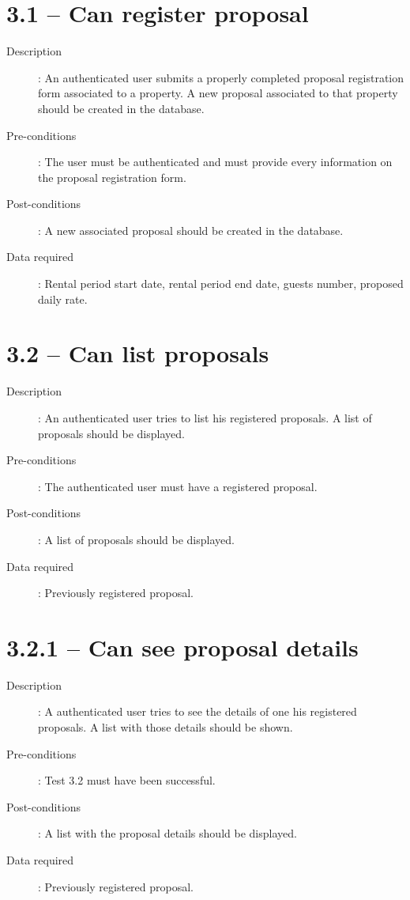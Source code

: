 \section*{3.1 – Can register proposal}

\begin{description}
    \item[Description]: An authenticated user submits a properly completed proposal registration form associated to a property. A new proposal associated to that property should be created in the database.
    \item[Pre-conditions]: The user must be authenticated and must provide every information on the proposal registration form.
    \item[Post-conditions]: A new associated proposal should be created in the database.
    \item[Data required]: Rental period start date, rental period end date, guests number, proposed daily rate.
\end{description}

\section*{3.2 – Can list proposals}

\begin{description}
    \item[Description]: An authenticated user tries to list his registered proposals. A list of proposals should be displayed.
    \item[Pre-conditions]: The authenticated user must have a registered proposal.
    \item[Post-conditions]: A list of proposals should be displayed.
    \item[Data required]: Previously registered proposal.
\end{description}

\section*{3.2.1 – Can see proposal details}
\begin{description}
    \item[Description]: A authenticated user tries to see the details of one his registered proposals. A list with those details should be shown.
    \item[Pre-conditions]: Test 3.2 must have been successful.
    \item[Post-conditions]: A list with the proposal details should be displayed.
    \item[Data required]: Previously registered proposal.
\end{description}

